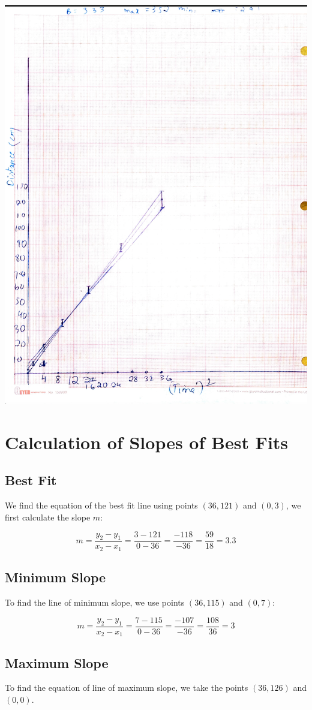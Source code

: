 \documentclass[12pt, letterpaper]{article}
\begin{document}
\includegraphics[width=0.75\linewidth]{Phys 141//Lab Reports/linearized.png}

\section{Calculation of Slopes of Best Fits}
\subsection{Best Fit}
We find the equation of the best fit line using points $(36, 121)$ and $(0, 3)$, we first calculate the slope $m$:

\[
m = \frac{y_2 - y_1}{x_2 - x_1} = \frac{3 - 121}{0 - 36} = \frac{-118}{-36} = \frac{59}{18} = 3.3
\]


\subsection{Minimum Slope}
To find the line of minimum slope, we use points $(36, 115)$ and $(0, 7)$:

\[
m = \frac{y_2 - y_1}{x_2 - x_1} = \frac{7 - 115}{0 - 36} = \frac{-107}{-36} = \frac{108}{36} = 3
\]




\subsection{Maximum Slope}
To find the equation of line of maximum slope, we take the points $(36, 126)$ and $(0, 0)$.
\end{document}
